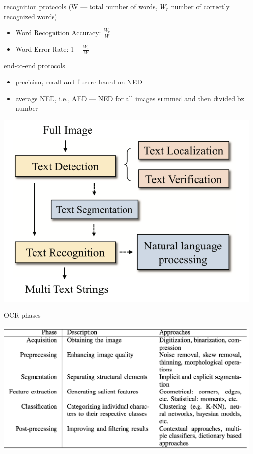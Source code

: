 recognition protocols (W --- total number of words, $W_r$ number of correctly recognized words)
\begin{itemize}
    \item Word Recognition Accuracy: $\frac{W_r}{W}$
    \item Word Error Rate: $1 - \frac{W_r}{W}$
\end{itemize}
end-to-end protocols
\begin{itemize}
    \item precision, recall and f-score based on NED
    \item average NED, i.e., AED --- NED for all images summed and then divided bz number
\end{itemize}


\includegraphics[width=\textwidth]{img/OCR-Pipeline.png}

OCR-phases~\cite{sourvanos_challenges_2018}

\includegraphics[width=\textwidth]{img/OCR-Phases.png}

